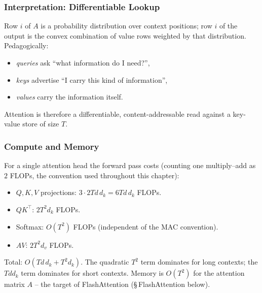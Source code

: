 \subsubsection{Interpretation: Differentiable Lookup}

Row $i$ of $A$ is a probability distribution over context positions;
row $i$ of the output is the convex combination of value rows weighted
by that distribution. Pedagogically:
\begin{itemize}
  \item \emph{queries} ask ``what information do I need?'',
  \item \emph{keys} advertise ``I carry this kind of information'',
  \item \emph{values} carry the information itself.
\end{itemize}
Attention is therefore a differentiable, content-addressable read
against a key-value store of size $T$.

\subsubsection{Compute and Memory}

For a single attention head the forward pass costs (counting one
multiply--add as $2$ FLOPs, the convention used throughout this
chapter):
\begin{itemize}
  \item $Q, K, V$ projections: $3 \cdot 2 T d\, d_k = 6 T d\, d_k$ FLOPs.
  \item $Q K^{\top}$: $2 T^2 d_k$ FLOPs.
  \item Softmax: $O(T^2)$ FLOPs (independent of the MAC convention).
  \item $A V$: $2 T^2 d_v$ FLOPs.
\end{itemize}
Total: $O(T d\, d_k + T^2 d_k)$. The quadratic $T^2$ term dominates
for long contexts; the $T d d_k$ term dominates for short contexts.
Memory is $O(T^2)$ for the attention matrix $A$ -- the target of
FlashAttention (\S\,FlashAttention below).

